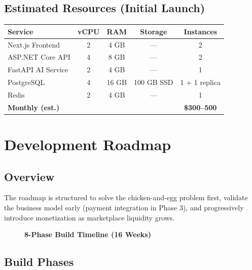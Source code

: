\documentclass[12pt,a4paper,twoside]{report}
\begin{document}
\section{Estimated Resources (Initial Launch)}

\begin{longtable}{l|c|c|c|c}
\toprule
\textbf{Service} & \textbf{vCPU} & \textbf{RAM} & \textbf{Storage} & \textbf{Instances} \\
\midrule
\endhead
\bottomrule
\endfoot
Next.js Frontend  & 2 & 4 GB & --- & 2 \\
ASP.NET Core API  & 4 & 8 GB & --- & 2 \\
FastAPI AI Service & 2 & 4 GB & --- & 1 \\
PostgreSQL        & 4 & 16 GB & 100 GB SSD & 1 + 1 replica \\
Redis             & 2 & 4 GB & --- & 1 \\
\textbf{Monthly (est.)} & & & & \textbf{\$300--500} \\
\bottomrule
\end{longtable}

\chapter{Development Roadmap}

\section{Overview}

The roadmap is structured to solve the chicken-and-egg problem first, validate the business model early (payment integration in Phase 3), and progressively introduce monetization as marketplace liquidity grows.

\begin{figure}[H]
\centering
{}
\caption{\textbf{8-Phase Build Timeline (16 Weeks)}}
\end{figure}

\section{Build Phases}
\end{document}
